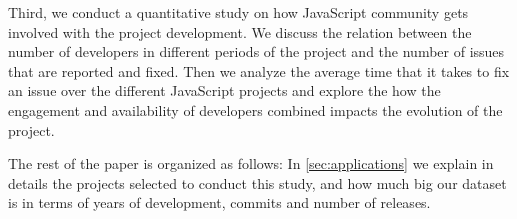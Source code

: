 Third, we conduct a quantitative study on how JavaScript community gets involved with the project development. We discuss the relation between the number of developers in different periods of the project and the number of issues that are reported and fixed. Then we analyze the average time that it takes to fix an issue over the different JavaScript projects and explore the how the engagement and availability of developers combined impacts the evolution of the project.

The rest of the paper is organized as follows: In \ref{sec:applications} we explain in details the projects selected to conduct this study, and how much big our dataset is in terms of years of development, commits and number of releases. 